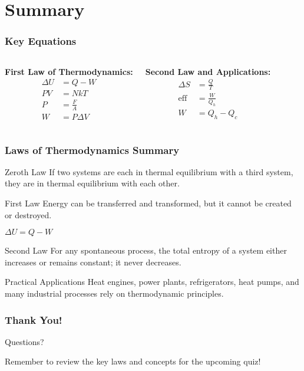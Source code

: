 \documentclass{beamer}
\begin{document}
\section{Summary}

\begin{frame}
    \frametitle{Key Equations}
    \begin{columns}
        \textbf{First Law of Thermodynamics:}
        \begin{align*}
            \Delta U &= Q - W \\
            PV &= NkT \\
            P &= \frac{F}{A} \\
            W &= P\Delta V
        \end{align*}
        
        \textbf{Second Law and Applications:}
        \begin{align*}
            \Delta S &= \frac{Q}{T} \\
            \text{eff} &= \frac{W}{Q_h} \\
            W &= Q_h - Q_c
        \end{align*}
    \end{columns}
\end{frame}

\begin{frame}
    \frametitle{Laws of Thermodynamics Summary}
    \begin{block}{Zeroth Law}
        If two systems are each in thermal equilibrium with a third system, they are in thermal equilibrium with each other.
    \end{block}
    
    \begin{block}{First Law}
        Energy can be transferred and transformed, but it cannot be created or destroyed.
        
        $\Delta U = Q - W$
    \end{block}
    
    \begin{block}{Second Law}
        For any spontaneous process, the total entropy of a system either increases or remains constant; it never decreases.
    \end{block}
    
    \begin{block}{Practical Applications}
        Heat engines, power plants, refrigerators, heat pumps, and many industrial processes rely on thermodynamic principles.
    \end{block}
\end{frame}

\begin{frame}
    \frametitle{Thank You!}
    \begin{center}
        \Huge{Questions?}
        
        \vspace{1cm}
        \normalsize
        Remember to review the key laws and concepts for the upcoming quiz!
    \end{center}
\end{frame}
\end{document}
